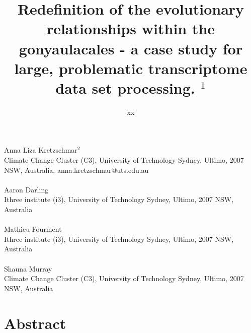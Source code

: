 \documentclass[12pt]{article}
\title{Redefinition of the evolutionary relationships within the gonyaulacales - a case study for large, problematic transcriptome data set processing. $^{1}$}
\author{xx}
\date{}
\begin{document}
\maketitle
\paragraph{}Anna Liza Kretzschmar$^{2}$\\
Climate Change Cluster (C3), University of Technology Sydney, Ultimo, 2007 NSW, Australia, anna.kretzschmar@uts.edu.au
\paragraph{}Aaron Darling \\
Ithree institute (i3), University of Technology Sydney, Ultimo, 2007 NSW, Australia
\paragraph{}Mathieu Fourment \\
Ithree institute (i3), University of Technology Sydney, Ultimo, 2007 NSW, Australia
\paragraph{}Shauna Murray\\ 
Climate Change Cluster (C3), University of Technology Sydney, Ultimo, 2007 NSW, Australia
\newpage
\section{Abstract}
\newpage
\end{document}

